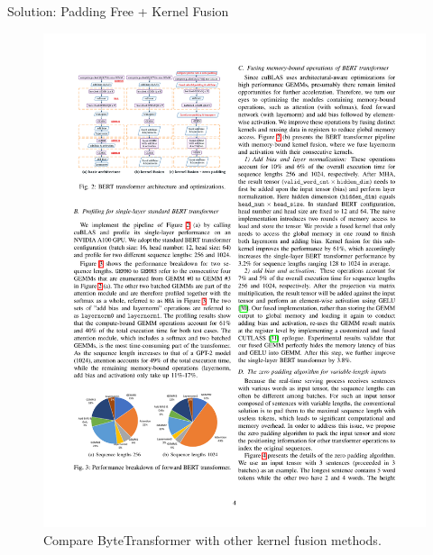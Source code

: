 \begin{frame}{Solution: Padding Free + Kernel Fusion}
    \begin{figure}
        \includegraphics[width=1\linewidth]{./images/bytetransformer_overview.pdf}
        \caption{Compare ByteTransformer with other kernel fusion methods.}
    \end{figure}
\end{frame}

